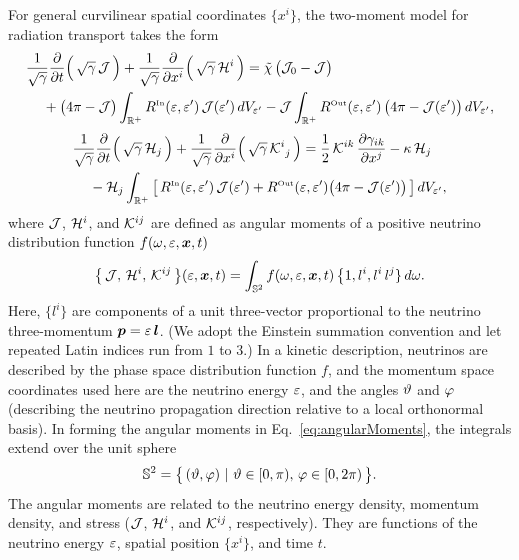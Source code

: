 \documentclass[10pt,preprint]{aastex}
\begin{document}
For general curvilinear spatial coordinates $\{x^{i}\}$, the two-moment model for radiation transport takes the form \citep[see, e.g.,][for fully general relativistic treatments]{shibata_etal_2011,cardall_etal_2013a}
\begin{align}
  &\frac{1}{\sqrt{\gamma}}\frac{\partial }{\partial t}\Big(\,\sqrt{\gamma}\,\mathcal{J}\,\Big)
  +\frac{1}{\sqrt{\gamma}}\frac{\partial }{\partial x^{i}}\Big(\,\sqrt{\gamma}\,\mathcal{H}^{i}\,\Big)
  =\tilde{\chi}\,\big(\mathcal{J}_{0}-\mathcal{J}\big) \nonumber \\
  &\hspace{12pt}
  +\big(4\pi-\mathcal{J}\big)\int_{\mathbb{R}^{+}}R^{\mbox{\tiny In}}(\varepsilon,\varepsilon')\,\mathcal{J}(\varepsilon')\,dV_{\varepsilon'}
  -\mathcal{J}\int_{\mathbb{R}^{+}}R^{\mbox{\tiny Out}}(\varepsilon,\varepsilon')\,\big(4\pi-\mathcal{J}(\varepsilon')\big)\,dV_{\varepsilon'},
  \label{eq:momentEquationEnergy}
\end{align}
\begin{align}
  &\frac{1}{\sqrt{\gamma}}\frac{\partial }{\partial t}\Big(\,\sqrt{\gamma}\,\mathcal{H}_{j}\,\Big)
  +\frac{1}{\sqrt{\gamma}}\frac{\partial }{\partial x^{i}}\Big(\,\sqrt{\gamma}\,\mathcal{K}^{i}_{~j}\,\Big)
  =\frac{1}{2}\,\mathcal{K}^{ik}\,\frac{\partial \gamma_{ik}}{\partial x^{j}}-\kappa\,\mathcal{H}_{j} \nonumber \\
  &\hspace{12pt}
  -\mathcal{H}_{j}\int_{\mathbb{R}^{+}}\big[\,R^{\mbox{\tiny In}}(\varepsilon,\varepsilon')\,\mathcal{J}(\varepsilon')+R^{\mbox{\tiny Out}}(\varepsilon,\varepsilon')\big(4\pi-\mathcal{J}(\varepsilon')\big)\,\big]\,dV_{\varepsilon'},
  \label{eq:momentEquationMomentum}
\end{align}
where $\mathcal{J}$, $\mathcal{H}^{i}$, and $\mathcal{K}^{ij}$ are defined as angular moments of a positive neutrino distribution function $f(\omega,\varepsilon,\boldsymbol{x},t)$
\begin{equation}
  \big\{\,\mathcal{J},\,\mathcal{H}^{i},\,\mathcal{K}^{ij}\,\big\}(\varepsilon,\boldsymbol{x},t)
  =\int_{\mathbb{S}^{2}}f(\omega,\varepsilon,\boldsymbol{x},t)\,\big\{1,l^{i},l^{i}\,l^{j}\}\,d\omega.  
  \label{eq:angularMoments}
\end{equation}
Here, $\{l^{i}\}$ are components of a unit three-vector proportional to the neutrino three-momentum $\boldsymbol{p}=\varepsilon\,\boldsymbol{l}$.  
(We adopt the Einstein summation convention and let repeated Latin indices run from $1$ to $3$.)
In a kinetic description, neutrinos are described by the phase space distribution function $f$, and the momentum space coordinates used here are the neutrino energy $\varepsilon$, and the angles $\vartheta$ and $\varphi$ (describing the neutrino propagation direction relative to a local orthonormal basis).  
In forming the angular moments in Eq.~\eqref{eq:angularMoments}, the integrals extend over the unit sphere
\begin{equation}
  \mathbb{S}^{2}=\big\{\,(\vartheta,\varphi)~|~\vartheta\in[0,\pi),\,\varphi\in[0,2\pi)\,\big\}.  
\end{equation}
The angular moments are related to the neutrino energy density, momentum density, and stress ($\mathcal{J}$, $\mathcal{H}^{i}$, and $\mathcal{K}^{ij}$, respectively).  
They are functions of the neutrino energy $\varepsilon$, spatial position $\{x^{i}\}$, and time $t$.  
\end{document}
